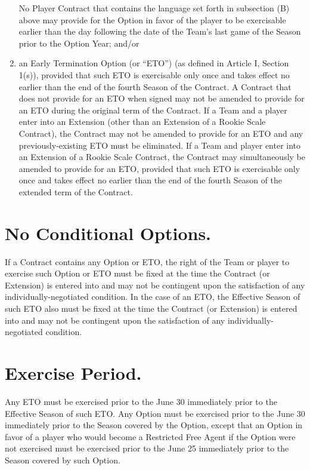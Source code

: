 \documentclass[
]{book}
\begin{document}
\begin{enumerate}
  No Player Contract that contains the language set forth in subsection (B) above may provide for the Option in favor of the player to be exercisable earlier than the day following the date of the Team's last game of the Season prior to the Option Year; and/or
\item
  an Early Termination Option (or ``ETO'') (as defined in Article I, Section 1(s)), provided that such ETO is exercisable only once and takes effect no earlier than the end of the fourth Season of the Contract. A Contract that does not provide for an ETO when signed may not be amended to provide for an ETO during the original term of the Contract. If a Team and a player enter into an Extension (other than an Extension of a Rookie Scale Contract), the Contract may not be amended to provide for an ETO and any previously-existing ETO must be eliminated. If a Team and player enter into an Extension of a Rookie Scale Contract, the Contract may simultaneously be amended to provide for an ETO, provided that such ETO is exercisable only once and takes effect no earlier than the end of the fourth Season of the extended term of the Contract.
\end{enumerate}

\hypertarget{no-conditional-options.}{%
\section{No Conditional Options.}\label{no-conditional-options.}}

If a Contract contains any Option or ETO, the right of the Team or player to exercise such Option or ETO must be fixed at the time the Contract (or Extension) is entered into and may not be contingent upon the satisfaction of any individually-negotiated condition. In the case of an ETO, the Effective Season of such ETO also must be fixed at the time the Contract (or Extension) is entered into and may not be contingent upon the satisfaction of any individually-negotiated condition.

\hypertarget{exercise-period.}{%
\section{Exercise Period.}\label{exercise-period.}}

Any ETO must be exercised prior to the June 30 immediately prior to the Effective Season of such ETO. Any Option must be exercised prior to the June 30 immediately prior to the Season covered by the Option, except that an Option in favor of a player who would become a Restricted Free Agent if the Option were not exercised must be exercised prior to the June 25 immediately prior to the Season covered by such Option.
\end{document}
